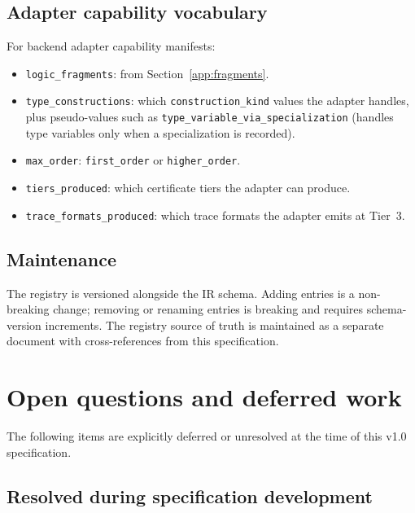 \documentclass[11pt,letterpaper]{article}
\theoremstyle{definition}
\theoremstyle{remark}
\begin{document}
\subsection{Adapter capability vocabulary}
\label{app:adapter-caps}

For backend adapter capability manifests:

\begin{itemize}[leftmargin=2em]
  \item \texttt{logic\_fragments}: from Section~\ref{app:fragments}.
  \item \texttt{type\_constructions}: which \texttt{construction\_kind}
        values the adapter handles, plus pseudo-values such as
        \texttt{type\_variable\_via\_specialization} (handles type
        variables only when a specialization is recorded).
  \item \texttt{max\_order}: \texttt{first\_order} or \texttt{higher\_order}.
  \item \texttt{tiers\_produced}: which certificate tiers the adapter
        can produce.
  \item \texttt{trace\_formats\_produced}: which trace formats the
        adapter emits at Tier~3.
\end{itemize}

\subsection{Maintenance}

The registry is versioned alongside the IR schema. Adding entries is a
non-breaking change; removing or renaming entries is breaking and
requires schema-version increments. The registry source of truth is
maintained as a separate document with cross-references from this
specification.

\section{Open questions and deferred work}
\label{app:open}

The following items are explicitly deferred or unresolved at the time
of this v1.0 specification.

\subsection{Resolved during specification development}
\end{document}
